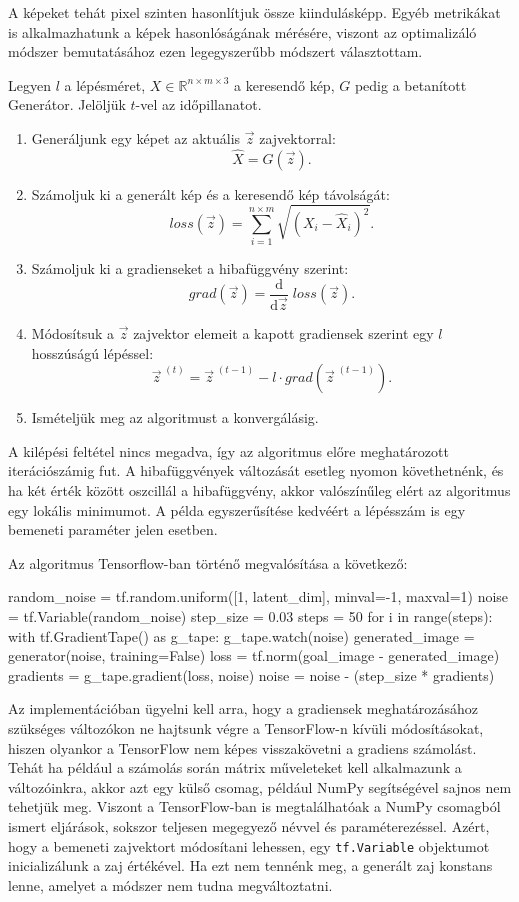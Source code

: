 A képeket tehát pixel szinten hasonlítjuk össze kiindulásképp.
Egyéb metrikákat is alkalmazhatunk a képek hasonlóságának mérésére, viszont az optimalizáló módszer bemutatásához ezen legegyszerűbb módszert választottam.

Legyen $l$ a lépésméret, $X \in \mathbb{R}^{n\times m \times 3}$ a keresendő kép, $G$ pedig a betanított Generátor. Jelöljük $t$-vel az időpillanatot.
\begin{enumerate}
	\item Generáljunk egy képet az aktuális $\vec{z}$ zajvektorral:
$$\hat X = G(\vec{z}).$$
	\item Számoljuk ki a generált kép és a keresendő kép távolságát:
$$ loss(\vec{z}) = \sum_{i=1}^{n\times m}\sqrt{(X_i-\hat X_i)^2}. $$
	\item Számoljuk ki a gradienseket a hibafüggvény szerint:
$$ grad(\vec{z}) = \frac{\mathrm{d}}{\mathrm{d}\vec{z}} \; loss(\vec{z}).$$
	\item Módosítsuk a $\vec{z}$ zajvektor elemeit a kapott gradiensek szerint egy $l$ hosszúságú lépéssel:
$$ \vec{z}^{\;(t)} = \vec{z}^{\;(t-1)} - l \cdot grad\left(\vec{z}^{\;(t-1)}\right).$$
	\item Ismételjük meg az algoritmust a konvergálásig.
\end{enumerate}

A kilépési feltétel nincs megadva, így az algoritmus előre meghatározott iterációszámig fut. A hibafüggvények változását esetleg nyomon követhetnénk, és ha két érték között oszcillál a hibafüggvény, akkor valószínűleg elért az algoritmus egy lokális minimumot. A példa egyszerűsítése kedvéért a lépésszám is egy bemeneti paraméter jelen esetben.

Az algoritmus Tensorflow-ban történő megvalósítása a következő:

\begin{python}
random_noise = tf.random.uniform([1, latent_dim], minval=-1, maxval=1)
noise = tf.Variable(random_noise)
step_size = 0.03
steps = 50
for i in range(steps):
    with tf.GradientTape() as g_tape:
        g_tape.watch(noise)
        generated_image = generator(noise, training=False)
        loss = tf.norm(goal_image - generated_image)
    gradients = g_tape.gradient(loss, noise)
    noise = noise - (step_size * gradients)
\end{python}

Az implementációban ügyelni kell arra, hogy a gradiensek meghatározásához szükséges változókon ne hajtsunk végre a TensorFlow-n kívüli módosításokat, hiszen olyankor a TensorFlow nem képes visszakövetni a gradiens számolást. Tehát ha például a számolás során mátrix műveleteket kell alkalmazunk a változóinkra, akkor azt egy külső csomag, például NumPy segítségével sajnos nem tehetjük meg. Viszont a TensorFlow-ban is megtalálhatóak a NumPy csomagból ismert eljárások, sokszor teljesen megegyező névvel és paraméterezéssel. Azért, hogy a bemeneti zajvektort módosítani lehessen, egy \texttt{tf.Variable} objektumot inicializálunk a zaj értékével. Ha ezt nem tennénk meg, a generált zaj konstans lenne, amelyet a módszer nem tudna megváltoztatni.

